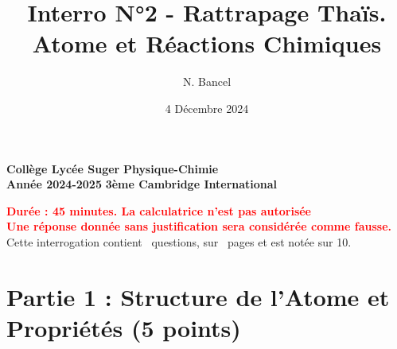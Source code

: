 \documentclass{exam}
\title{Interro N°2 - Rattrapage Thaïs. Atome et Réactions Chimiques}
\author{N. Bancel}
\date{4 Décembre 2024}
\begin{document}

\textbf{Collège Lycée Suger}
\hfill
\textbf{Physique-Chimie} \\

\textbf{Année 2024-2025}
\hfill
\textbf{3ème Cambridge International} \par

{\let\newpage\relax\maketitle}

\begin{center}
\textbf{\textcolor{red}{Durée : 45 minutes. La calculatrice n'est pas autorisée}} \\
\textbf{\textcolor{red}{Une réponse donnée sans justification sera considérée comme fausse.}} \\
Cette interrogation contient \numquestions\ questions, sur \numpages\ pages et est notée sur 10. 

\end{center}

\section*{Partie 1 : Structure de l'Atome et Propriétés (5 points)}
\end{document}
